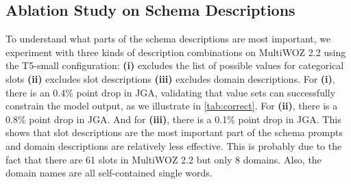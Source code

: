 \documentclass[11pt]{article}
\begin{document}
\begin{comment}
In \autoref{tab:domain}, we show the domain breakdown results for different versions of our systems. Description-augmented models are better whether using T5-small and T5-base in all domains except for taxi(T5-base) and attraction(T5-small).  
\begin{table}[t]
    \centering

    \begin{tabular}{lccccc}
    \toprule
        \textbf{Models}  & \textbf{attraction} & \textbf{hotel} & \textbf{restaurant} & \textbf{taxi} & \textbf{train} \\
        \midrule
        \textbf{T5-small}  & 89.06 & 81.98 & 88.79 & 97.38 & 89.40  \\
        \quad \textit{w.} desc & 89.28 & 82.40 & 89.06 & 96.96 & 89.89  \\
        \textbf{T5-base}  & 90.02 & 82.50 &  88.70 & 97.46 & 89.51 \\
        \quad \textit{w.} desc & \textbf{89.50} & \textbf{82.73} & \textbf{89.35}  & \textbf{97.53}   & \textbf{89.82} \\
        \bottomrule
    \end{tabular}
        \caption{Domain breakdown results on MultiWOZ 2.2. All numbers are reported in joint goal accuracy(JGA)(\%). \textit{w.} desc means the model is trained with the description.}
    \label{tab:domain}
\end{table}
\end{comment}

\vspace{-3mm}

\subsection{Ablation Study on Schema Descriptions}
To understand what parts of the schema descriptions are most important, we experiment with three kinds of description combinations on MultiWOZ 2.2 using the T5-small configuration: \textbf{(i)} excludes the list of possible values for categorical slots \textbf{(ii)} excludes slot descriptions \textbf{(iii)} excludes domain descriptions. For \textbf{(i)}, there is an 0.4\% point drop in JGA, validating that value sets can successfully constrain the model output, as we illustrate in \autoref{tab:correct}. For  \textbf{(ii)}, there is a 0.8\% point drop in JGA. And for \textbf{(iii)}, there is a 0.1\% point drop in JGA. This shows that slot descriptions are the most important part of the schema prompts and domain descriptions are relatively less effective. This is probably due to the fact that there are 61 slots in MultiWOZ 2.2 but only 8 domains. Also, the domain names are all self-contained single words. 
\end{document}
